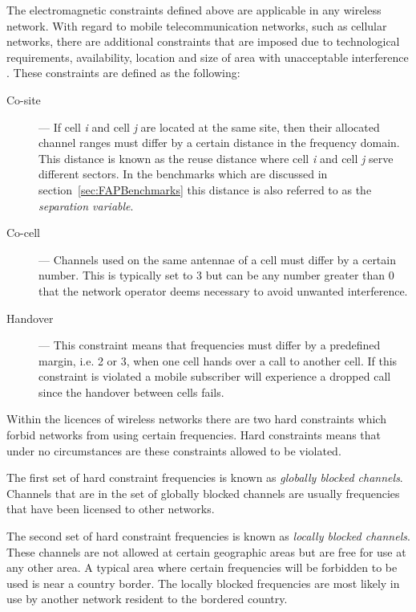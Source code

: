 The electromagnetic constraints defined above are applicable in any wireless network. With regard to mobile telecommunication networks, such as cellular networks, there are additional constraints that are imposed due to technological requirements, availability, location and size of area with unacceptable interference \cite{Karen2004,Eisenblatter,AndreasPaper}. These constraints are defined as the following:
\begin{description}
\item[Co-site] --- If cell \emph{i} and cell \emph{j} are located at the same site, then their allocated channel ranges must differ by a certain distance in the frequency domain. This distance is known as the reuse distance where cell \emph{i} and cell \emph{j} serve different sectors\cite{FixedFAPPSO,EgyptFAPPSO,Karen2004,AndreasPaper}. In the benchmarks which are discussed in section~\ref{sec:FAPBenchmarks} this distance is also referred to as the \emph{separation variable}. 
\item[Co-cell] --- Channels used on the same antennae of a cell must differ by a certain number. This is typically set to 3 but can be any number greater than 0 that the network operator deems necessary to avoid unwanted interference\cite{Karen2004,Eisenblatter,AndreasPaper}.
\item[Handover] --- This constraint means that frequencies must differ by a predefined margin, i.e. 2 or 3, when one cell hands over a call to another cell. If this constraint is violated a mobile subscriber will experience a dropped call since the handover between cells fails\cite{Karen2004,Eisenblatter,AndreasPaper}.
\end{description}

Within the licences of wireless networks there are two hard constraints which forbid networks from using certain frequencies. Hard constraints means that under no circumstances are these constraints allowed to be violated.

The first set of hard constraint frequencies is known as \emph{globally blocked channels}. Channels that are in the set of globally blocked channels are usually frequencies that have been licensed to other networks\cite{Eisenblatter,Karen2004,InterferenceOrientatedFAP}.

The second set of hard constraint frequencies is known as \emph{locally blocked channels}. These channels are not allowed at certain geographic areas but are free for use at any other area\cite{Eisenblatter,Karen2004,InterferenceOrientatedFAP}. A typical area where certain frequencies will be forbidden to be used is near a country border\cite{Eisenblatter,Karen2004,InterferenceOrientatedFAP}. The locally blocked frequencies are most likely in use by another network resident to the bordered country.

